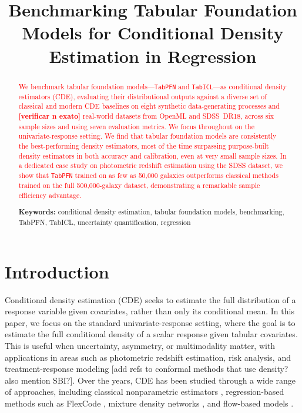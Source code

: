\documentclass{article}
\title{Benchmarking Tabular Foundation Models for Conditional Density Estimation in Regression}
\author{
  Rafael Izbicki\thanks{Department of Statistics, Federal University of S\~{a}o Carlos (UFSCar), Brazil. \texttt{rafaelizb@gmail.com}
  \and
  Pedro L. C. Rodrigues\thanks{Inria Grenoble, France.}}
}
\newcommand{\method}[1]{\texttt{#1}}
\begin{document}
\maketitle

\begin{abstract}

\textcolor{red}{We benchmark tabular foundation models---\method{TabPFN} and \method{TabICL}---as conditional density estimators (CDE), evaluating their distributional outputs against a diverse set of classical and modern CDE baselines on eight synthetic data-generating processes and \textbf{[verificar n exato]} real-world datasets from OpenML and SDSS~DR18, across six sample sizes and using seven evaluation metrics. We focus throughout on the univariate-response setting. We find that tabular foundation models are consistently the best-performing density estimators, most of the time surpassing purpose-built density estimators in both accuracy and calibration, even at very small sample sizes. In a dedicated case study on photometric redshift estimation using the SDSS dataset, we show that \method{TabPFN} trained on as few as 50{,}000 galaxies outperforms classical methods trained on the full 500{,}000-galaxy dataset, demonstrating a remarkable sample efficiency advantage.}

\textbf{Keywords:} conditional density estimation, tabular foundation models,
benchmarking, TabPFN, TabICL, uncertainty quantification, regression
\end{abstract}


\section{Introduction}
\label{sec:intro}

Conditional density estimation (CDE) seeks to estimate the full distribution of
a response variable given covariates, rather than only its conditional mean.
In this paper, we focus on the standard univariate-response setting, where the goal is to estimate the full conditional density of a scalar response given tabular covariates.
This is useful when uncertainty, asymmetry, or multimodality matter, with
applications in areas such as photometric redshift estimation, risk analysis,
and treatment-response modeling
\citep{schmidt2020evaluation,izbicki2017photo,koenker2005quantile,hothorn2014conditional} [add refs to conformal methods that use density? also mention SBI?].
Over the years, CDE has been studied through a wide range of approaches,
including classical nonparametric estimators \citep{rosenblatt1969conditional,hyndman1996estimating},
regression-based methods such as FlexCode \citep{izbicki2017converting},
mixture density networks \citep{bishop1994mixture}, and flow-based models
\citep{papamakarios2021normalizing}.
\end{document}
